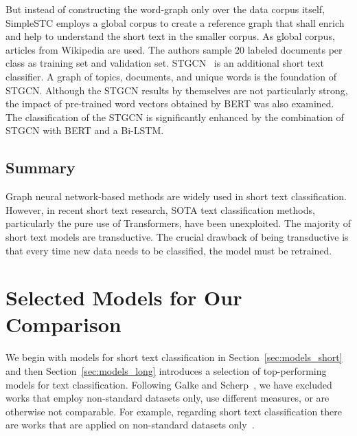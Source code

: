 \documentclass[runningheads]{llncs}
\begin{document}
But instead of constructing the word-graph only over the data corpus itself, SimpleSTC employs a global corpus to create a reference graph that shall enrich and help to understand the short text in the smaller corpus.
As global corpus, articles from Wikipedia are used.
The authors sample 20 labeled documents per class as training set and validation set.
\ac{STGCN}~\cite{ye2020document} is an additional short text classifier. A graph of topics, documents, and unique words is the foundation of STGCN. Although the STGCN results by themselves are not particularly strong, the impact of pre-trained word vectors obtained by BERT was also examined. The classification of the STGCN is significantly enhanced by the combination of STGCN with BERT and a Bi-LSTM.
\subsection{Summary}
\label{rw-summary}
Graph neural network-based methods are widely used in short text classification. 
However, in recent short text research, \ac{SOTA} text classification methods, particularly the pure use of Transformers, have been unexploited.
The majority of short text models are transductive. 
The crucial drawback of being transductive is that every time new data needs to be classified, the model must be retrained.

\section{Selected Models for Our Comparison}
\label{sec:models}

We begin with models for short text classification in Section~\ref{sec:models_short} and then Section~\ref{sec:models_long} introduces a selection of top-performing models for text classification.
Following Galke and Scherp~\cite{galkeMLP}, we have excluded works that employ non-standard datasets only, use different measures, or are otherwise not comparable.
For example, regarding short text classification there are works that are applied on non-standard datasets only~\cite{HuEtAl2022,DBLP:conf/nlpcc/ZhongZZZ21}.
\end{document}
